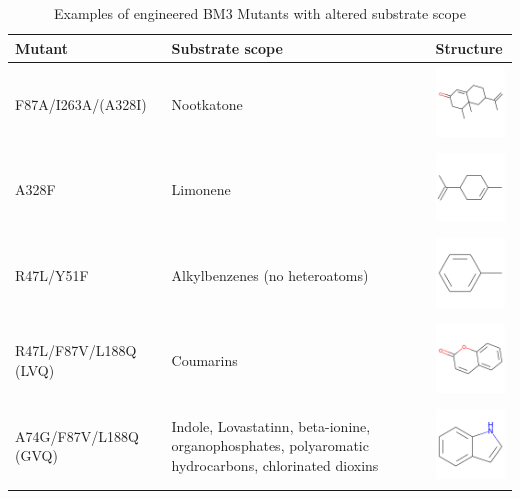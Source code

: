 \documentclass{article}
\begin{document}
\begin{table}
	\begin{center}
		\caption{\label{bm3_table}Examples of engineered BM3 Mutants with altered substrate scope \cite{wong}}
		\begin{tabular}{l|p{3cm}|l}
		\textbf{Mutant} & \textbf{Substrate scope} & \textbf{Structure} \\
		\hline 
		F87A/I263A/(A328I) & Nootkatone & \includegraphics[width = 2cm, height= 2cm, keepaspectratio=true]{img/nookatone.png} \\
		A328F & Limonene & \includegraphics[width=2cm, height= 2cm, keepaspectratio=true]{img/limonene.png} \\
		R47L/Y51F & Alkylbenzenes (no heteroatoms) & \includegraphics[width=2cm, height= 2cm, keepaspectratio=true]{img/alkyl-benzene.png} \\
			R47L/F87V/L188Q (LVQ) & Coumarins & \includegraphics[width=2cm, height= 2cm, keepaspectratio=true]{img/coumarin.png} \\ %
			A74G/F87V/L188Q (GVQ) & Indole, Lovastatinn, beta-ionine, organophosphates, polyaromatic hydrocarbons, chlorinated dioxins & \includegraphics[width=2cm, height= 2cm, keepaspectratio=true]{img/indole.png} \\
	\end{tabular}
	\end{center}
\end{table}
\end{document}
